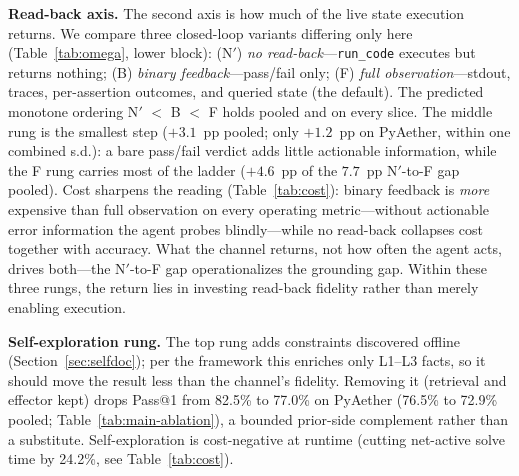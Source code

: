 \textbf{Read-back axis.} The second axis is how much of the live state execution returns. We compare three closed-loop variants differing only here (Table~\ref{tab:omega}, lower block): (N$'$) \emph{no read-back}---\texttt{run\_code} executes but returns nothing; (B) \emph{binary feedback}---pass/fail only; (F) \emph{full observation}---stdout, traces, per-assertion outcomes, and queried state (the default). The predicted monotone ordering N$'$ $<$ B $<$ F holds pooled and on every slice. The middle rung is the smallest step ($+3.1$~pp pooled; only $+1.2$~pp on PyAether, within one combined s.d.): a bare pass/fail verdict adds little actionable information, while the F rung carries most of the ladder ($+4.6$~pp of the $7.7$~pp N$'$-to-F gap pooled). Cost sharpens the reading (Table~\ref{tab:cost}): binary feedback is \emph{more} expensive than full observation on every operating metric---without actionable error information the agent probes blindly---while no read-back collapses cost together with accuracy. What the channel returns, not how often the agent acts, drives both---the N$'$-to-F gap operationalizes the grounding gap. Within these three rungs, the return lies in investing read-back fidelity rather than merely enabling execution.

\textbf{Self-exploration rung.} The top rung adds constraints discovered offline (Section~\ref{sec:selfdoc}); per the framework this enriches only L1--L3 facts, so it should move the result less than the channel's fidelity. Removing it (retrieval and effector kept) drops Pass@1 from 82.5\% to 77.0\% on PyAether (76.5\% to 72.9\% pooled; Table~\ref{tab:main-ablation}), a bounded prior-side complement rather than a substitute. Self-exploration is cost-negative at runtime (cutting net-active solve time by 24.2\%, see Table~\ref{tab:cost}).

